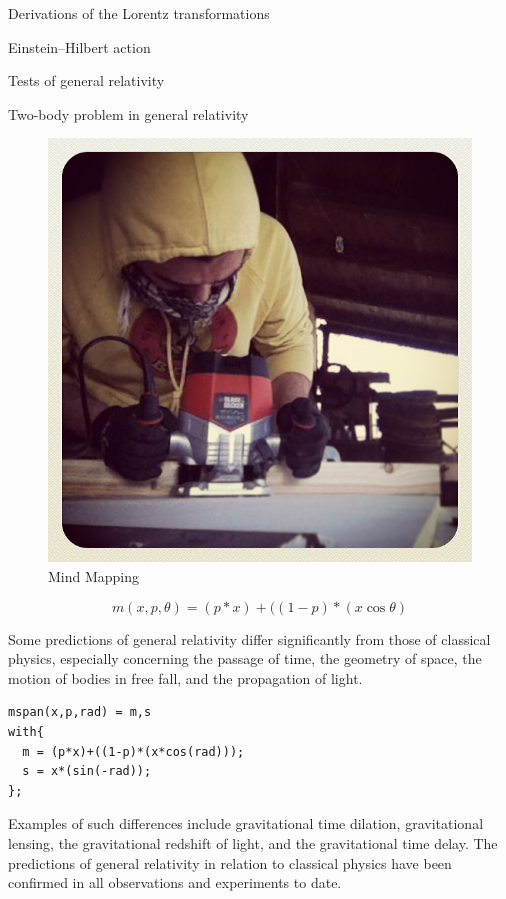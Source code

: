 \begin{compactitem}
\item Derivations of the Lorentz transformations
\item Einstein–Hilbert action
\item Tests of general relativity
\item Two-body problem in general relativity
\end{compactitem}

\begin{figure}[t]
\centering
\includegraphics[width=.47\textwidth]{img/image2.jpg}
\caption{Mind Mapping}
\label{gs}
\end{figure}

\begin{equation}
m(x,p,\theta) = (p*x) + ((1-p)*(x\cos\theta)
\label{eq:mid}
\end{equation}

Some predictions of general relativity differ significantly from those of
classical physics, especially concerning the passage of time, the geometry of
space, the motion of bodies in free fall, and the propagation of light.

\begin{lstlisting}
mspan(x,p,rad) = m,s
with{
  m = (p*x)+((1-p)*(x*cos(rad)));
  s = x*(sin(-rad));
};
\end{lstlisting}

Examples of such differences include gravitational time dilation, gravitational
lensing, the gravitational redshift of light, and the gravitational time delay.
The predictions of general relativity in relation to classical physics have been
confirmed in all observations and experiments to date.

\vfill\null

\raggedright





